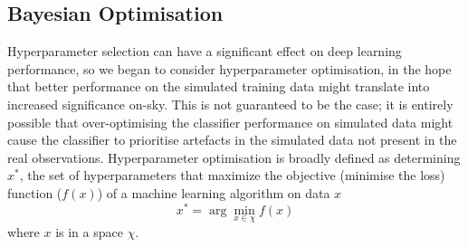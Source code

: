 \subsection{Bayesian Optimisation}
Hyperparameter selection can have a significant effect on deep learning performance, so we began to consider hyperparameter optimisation, in the hope that better performance on the simulated training data might translate into increased significance on-sky. This is not guaranteed to be the case; it is entirely possible that over-optimising the classifier performance on simulated data might cause the classifier to prioritise artefacts in the simulated data not present in the real observations. Hyperparameter optimisation is broadly defined as determining $x^*$, the set of hyperparameters that maximize the objective (minimise the loss) function ($f(x)$) of a machine learning algorithm on  data $x$ \begin{equation}
    x^*=\arg \min_{x \in \chi} f(x)
\end{equation}
where $x$ is in a space $\chi$.

